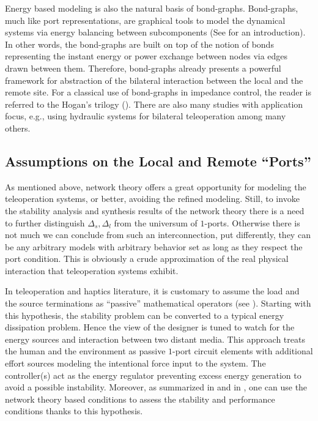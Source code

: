 Energy based modeling is also the natural basis of bond-graphs. Bond-graphs, much like port representations, are graphical tools 
to model the dynamical systems via energy balancing between subcomponents (See \cite{gawthrop} for an introduction). In other words, 
the bond-graphs are built on top of the notion of bonds representing the instant energy or power exchange between nodes via edges 
drawn between them. Therefore, bond-graphs already presents a powerful framework for abstraction of the bilateral interaction between 
the local and the remote site. For a classical use of bond-graphs in impedance control, the reader is referred to the Hogan's trilogy 
(\cite{hogan:1,hogan:2,hogan:3}). There are also many studies with application focus, e.g., \cite{krishnaswamy} using hydraulic 
systems for bilateral teleoperation among many others. 



\subsection{Assumptions on the Local and Remote \enquote{Ports}}

As mentioned above, network theory offers a great opportunity for modeling the teleoperation systems, or better, avoiding 
the refined modeling. Still, to invoke the stability analysis and synthesis results of the network theory there is a need 
to further distinguish $\Delta_s,\Delta_l$ from the universum of $1$-ports. Otherwise there is not much we can conclude 
from such an interconnection, put differently, they can be any arbitrary models with arbitrary behavior set as long as they 
respect the port condition. This is obviously a crude approximation of the real physical interaction that teleoperation 
systems exhibit. 

In teleoperation and haptics literature, it is customary to assume the load and the source terminations as \enquote{passive}
mathematical operators (see ). Starting with this hypothesis, the stability problem can be converted to 
a typical energy dissipation problem. 
Hence the view of the designer is tuned to watch for the energy sources and interaction between two distant media. This approach 
treats the human and the environment as passive $1$-port circuit elements with additional effort sources modeling the 
intentional force input to the system. The controller(s) act as the energy regulator preventing excess energy generation 
to avoid a possible instability. Moreover, as summarized in  and in , one can use the 
network theory based conditions to assess the stability and performance conditions thanks to this hypothesis.

